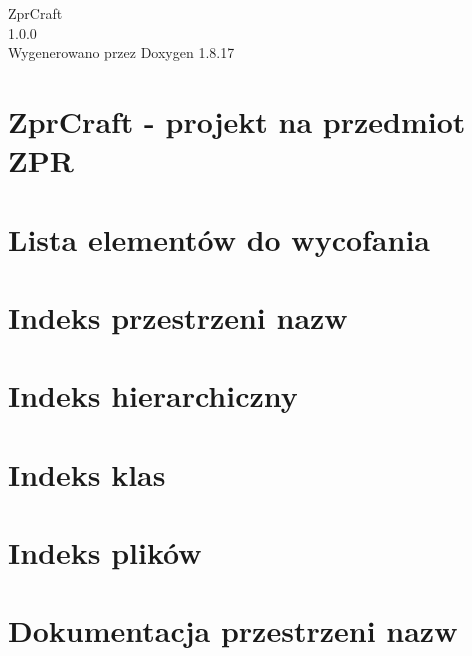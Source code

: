 \let\mypdfximage\pdfximage\def\pdfximage{\immediate\mypdfximage}\documentclass[twoside]{book}
\newcommand{\+}{\discretionary{\mbox{\scriptsize$\hookleftarrow$}}{}{}}
\newcommand{\clearemptydoublepage}{%
  \newpage{\pagestyle{empty}\cleardoublepage}%
}
\begin{document}
\hypersetup{pageanchor=false,
             bookmarksnumbered=true,
             pdfencoding=unicode
            }
\begin{titlepage}
\vspace*{7cm}
\begin{center}%
{\Large Zpr\+Craft \\[1ex]\large 1.\+0.\+0 }\\
\vspace*{1cm}
{\large Wygenerowano przez Doxygen 1.8.17}\\
\end{center}
\end{titlepage}
\clearemptydoublepage
{}
\tableofcontents
\clearemptydoublepage
{}
\hypersetup{pageanchor=true}

\chapter{Zpr\+Craft -\/ projekt na przedmiot Z\+PR}
\label{index}\hypertarget{index}{}
\chapter{Lista elementów do wycofania}
\label{deprecated}

\chapter{Indeks przestrzeni nazw}

\chapter{Indeks hierarchiczny}

\chapter{Indeks klas}

\chapter{Indeks plików}

\chapter{Dokumentacja przestrzeni nazw}







\end{document}
